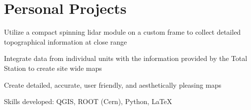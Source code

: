 \documentclass[letterpaper]{resume}
\begin{document}
\author{Sarah F. Majors}
\maketitle

%

\section{Personal Projects}

\begin{compactitem}
\item Utilize a compact spinning lidar module on a custom frame to collect detailed topographical information at close range
\item Integrate data from individual units with the information provided by the Total Station to create site wide maps
\item Create detailed, accurate, user friendly, and aesthetically pleasing maps
\item Skills developed: QGIS, ROOT (Cern), Python, LaTeX
\end{compactitem}
\end{document}
